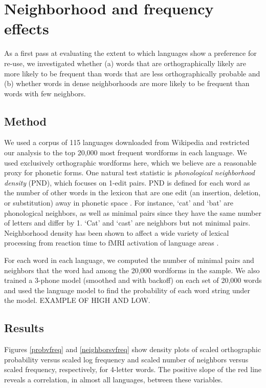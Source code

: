 \documentclass{article}
\begin{document}
\section{Neighborhood and frequency effects} 

As a first pass at evaluating the extent to which languages show a preference for re-use, we investigated
whether (a) words that are orthographically likely are more likely to be frequent than words that are less
orthographically probable and (b) whether words in dense neighborhoods are more likely to be frequent than
words with few neighbors.

\subsection{Method} We used a corpus of 115 languages downloaded from Wikipedia and restricted our analysis to
the top 20,000 most frequent wordforms in each language. We used exclusively orthographic wordforms here,
which we believe are a reasonable proxy for phonetic forms. One natural test statistic is \emph{phonological neighborhood density} (PND),
which focuses on 1-edit pairs. PND is defined for each word as the number of other words in the lexicon that
are one edit (an insertion, deletion, or substitution) away in phonetic space
\citep{luce1986neighborhoods,luce1998recognizing}. For instance, `cat' and `bat' are phonological neighbors,
as well as minimal pairs since they have the same number of letters and differ by 1. `Cat' and `cast' are
neighbors but not minimal pairs.
Neighborhood density has been shown to affect a wide variety of lexical processing from reaction time
\citep{vitevitch1998words} to fMRI activation of language areas \citep{prabhakaran2006event}.

For each word in each language, we computed the
number of minimal pairs and neighbors that the word had among the 20,000 wordforms in the sample. We also
trained a 3-phone model (smoothed and with backoff) on each set of 20,000 words and used the language model to
find the probability of each word string under the model. EXAMPLE OF HIGH AND LOW.

\subsection{Results} 


Figures \ref{probvfreq} and \ref{neighborsvfreq} show density plots of scaled orthographic probability versus
scaled log frequency and scaled number of neighbors versus scaled frequency, respectively, for 4-letter words.
The positive slope of the red line reveals a correlation, in almost all languages, between these variables.
\end{document}
